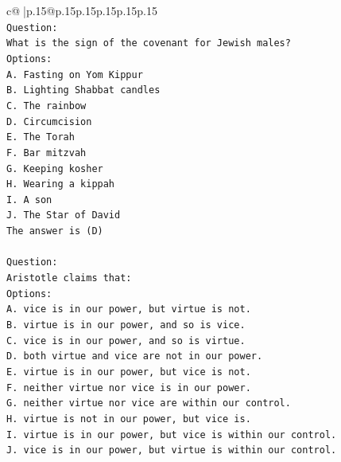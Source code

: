 \documentclass{article}
\begin{document}
{\begin{supertabular}{c@{$\;$}|p{.15\linewidth}@{}p{.15\linewidth}p{.15\linewidth}p{.15\linewidth}p{.15\linewidth}p{.15\linewidth}}
{{{\\ 
\texttt{Question:} \\
\texttt{What is the sign of the covenant for Jewish males?} \\
\texttt{Options:} \\
\texttt{A. Fasting on Yom Kippur} \\
\texttt{B. Lighting Shabbat candles} \\
\texttt{C. The rainbow} \\
\texttt{D. Circumcision} \\
\texttt{E. The Torah} \\
\texttt{F. Bar mitzvah} \\
\texttt{G. Keeping kosher} \\
\texttt{H. Wearing a kippah} \\
\texttt{I. A son} \\
\texttt{J. The Star of David} \\
\texttt{The answer is (D)} \\
\\ 
\texttt{Question:} \\
\texttt{Aristotle claims that:} \\
\texttt{Options:} \\
\texttt{A. vice is in our power, but virtue is not.} \\
\texttt{B. virtue is in our power, and so is vice.} \\
\texttt{C. vice is in our power, and so is virtue.} \\
\texttt{D. both virtue and vice are not in our power.} \\
\texttt{E. virtue is in our power, but vice is not.} \\
\texttt{F. neither virtue nor vice is in our power.} \\
\texttt{G. neither virtue nor vice are within our control.} \\
\texttt{H. virtue is not in our power, but vice is.} \\
\texttt{I. virtue is in our power, but vice is within our control.} \\
\texttt{J. vice is in our power, but virtue is within our control.} \\
            }
        }
    }
     \\ \\


\end{supertabular}}
\end{document}
